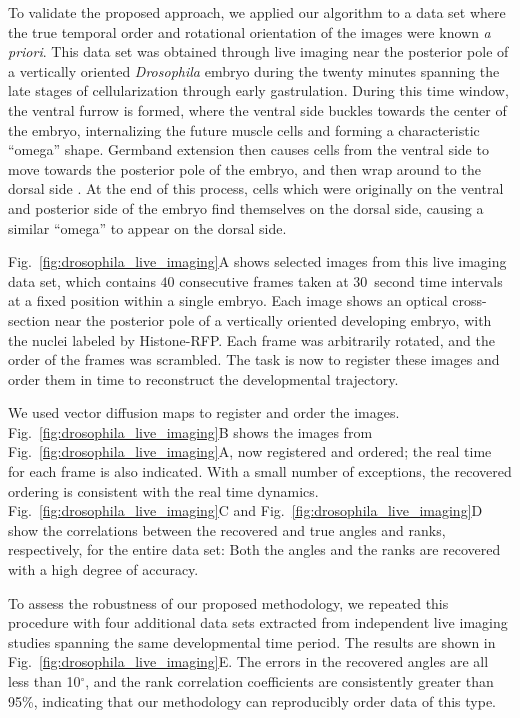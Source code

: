 \documentclass[twocolumn, 10pt]{article}
\newcommand{\fig}[0]{Fig.}
\begin{document}
To validate the proposed approach, we applied our algorithm to a data set where the true temporal order and rotational orientation of the images were known {\em a priori}.
%
This data set was obtained through live imaging near the posterior pole of a vertically oriented {\it Drosophila} embryo during the twenty minutes spanning the late stages of cellularization through early gastrulation.
%
During this time window, the ventral furrow is formed, where the ventral side buckles towards the center of the embryo, internalizing the future muscle cells and forming a characteristic ``omega'' shape.
%
Germband extension then causes cells from the ventral side to move towards the posterior pole of the embryo, and then wrap around to the dorsal side \citep{leptin2005gastrulation}.
%
At the end of this process, cells which were originally on the ventral and posterior side of the embryo find themselves on the dorsal side, causing a similar ``omega'' to appear on the dorsal side.

\fig~\ref{fig:drosophila_live_imaging}A shows selected images from this live imaging data set, which contains $40$ consecutive frames taken at $30$~second time intervals at a fixed position within a single embryo.
%
Each image shows an optical cross-section near the posterior pole of a vertically oriented developing embryo, with the nuclei labeled by Histone-RFP.
%
Each frame was arbitrarily rotated, and the order of the frames was scrambled.
%
The task is now to register these images and order them in time to reconstruct the developmental trajectory.

We used vector diffusion maps to register and order the images. 
%
\fig~\ref{fig:drosophila_live_imaging}B shows the images from \fig~\ref{fig:drosophila_live_imaging}A, now registered and ordered; the real time for each frame is also indicated.
%
With a small number of exceptions, the recovered ordering is consistent with the real time dynamics. 
%
\fig~\ref{fig:drosophila_live_imaging}C and \fig~\ref{fig:drosophila_live_imaging}D  show the correlations between the recovered and true angles and ranks, respectively, for the entire data set: 
%
Both the angles and the ranks are recovered with a high degree of accuracy.

To assess the robustness of our proposed methodology, we repeated this procedure with four additional data sets extracted from independent live imaging studies spanning the same developmental time period. 
%
The results are shown in \fig~\ref{fig:drosophila_live_imaging}E. 
%
The errors in the recovered angles are all less than 10$^\circ$, and the rank correlation coefficients are consistently greater than 95\%, indicating that our methodology can reproducibly order data of this type. 
\end{document}
